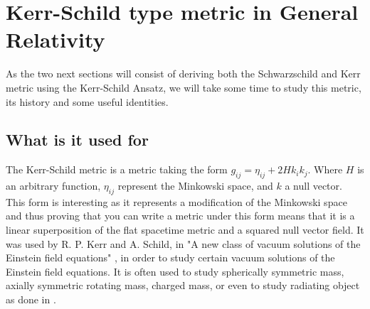 \documentclass[a4paper,12pt]{article}
\theoremstyle{definition}
\begin{document}
\section{Kerr-Schild type metric in General Relativity}
As the two next sections will consist of deriving both the Schwarzschild and Kerr metric using the Kerr-Schild Ansatz,
we will take some time to study this metric, its history and some useful identities.
\subsection{What is it used for}
The Kerr-Schild metric is a metric taking the form $g_{ij}=\eta_{ij}+2Hk_ik_j$.
Where $H$ is an arbitrary function, $\eta_{ij}$ represent the Minkowski space, and $k$ a null vector.
This form is interesting as it represents a modification of the Minkowski space and thus proving that you can write a metric under this form means that it is a linear superposition of the flat spacetime metric and a squared null vector field.
It was used by R. P. Kerr and A. Schild, in "A new class of vacuum solutions of the Einstein field equations" \cite{KerrSchild}, in order to study certain vacuum solutions of the Einstein field equations.
It is often used to study spherically symmetric mass, axially symmetric rotating mass, charged mass, or even to study radiating object as done in \cite{BohmerHogan}.
\end{document}

